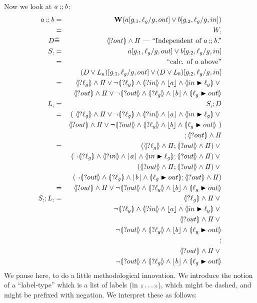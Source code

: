Now we look at $a \mathbin{;\!;} b$:
\begin{eqnarray*}
   a \cseq b
   &=& \W(a[g_{:1},\ell_g/g,out] \lor b[g_{:2},\ell_g/g,in])
\\ &=& W_;
\\ D &\defs& \D \EOLC{Independent of $a\cseq b$.}
\\ S_; &=& a[g_{:1},\ell_g/g,out] \lor b[g_{:2},\ell_g/g,in]
\EQ{calc. of $a$ above}
\\ && (D \lor L_a)[g_{:1},\ell_g/g,out]
      \lor 
      (D \lor L_b)[g_{:2},\ell_g/g,in]
\\&=& \LS{\ell_g} \land \Skip
      \lor \lnot \LS{\ell_g}
           \land \LS{in} \land \ado a \land \LUPD{in}{\ell_g} \lor {}
\\&& \LS{out} \land \Skip
      \lor \lnot \LS{out}
           \land \LS{\ell_g} \land \ado b \land \LUPD{\ell_g}{out}
\\ L_; &=& S_; ; D
\\ &=& (~\LS{\ell_g} \land \Skip
      \lor \lnot \LS{\ell_g}
           \land \LS{in} \land \ado a \land \LUPD{in}{\ell_g} \lor {}
\\&& \LS{out} \land \Skip
      \lor \lnot \LS{out}
           \land \LS{\ell_g} \land \ado b \land \LUPD{\ell_g}{out}~)
\\&& {} ; \LS{out} \land \Skip
\\ &=& (\LS{\ell_g} \land \Skip ; \LS{out} \land \Skip) \lor{}
\\ &&  (\lnot \LS{\ell_g}
       \land \LS{in} \land \ado a \land \LUPD{in}{\ell_g}
       ; \LS{out} \land \Skip) \lor {}
\\ &&  (\LS{out} \land \Skip ; \LS{out} \land \Skip )\lor {}
\\ &&  (\lnot \LS{out}
           \land \LS{\ell_g} \land \ado b \land \LUPD{\ell_g}{out}
           ; \LS{out} \land \Skip )
\\ &=& \LS{out} \land \Skip \lor 
       \lnot \LS{out}
       \land \LS{\ell_g} \land \ado b \land \LUPD{\ell_g}{out}
\\ S_; ; L_; &=&
     \LS{\ell_g} \land \Skip \lor{}
\\&& \lnot \LS{\ell_g}
           \land \LS{in} \land \ado a \land \LUPD{in}{\ell_g} \lor {}
\\&& \LS{out} \land \Skip \lor {}
\\&&\lnot \LS{out}
           \land \LS{\ell_g} \land \ado b \land \LUPD{\ell_g}{out}
\\&& ;
\\&& \LS{out} \land \Skip \lor {}
\\&& \lnot \LS{out}
       \land \LS{\ell_g} \land \ado b \land \LUPD{\ell_g}{out}
\end{eqnarray*}
We pause here, to do a little methodological innovation.
We introduce the notion of a ``label-type''
which is a  list of labels (in ${\scriptscriptstyle\langle\!\langle} \dots {\scriptscriptstyle\rangle\!\rangle}$), 
which might be dashed,
and might be prefixed with negation.
We interpret these as follows:

